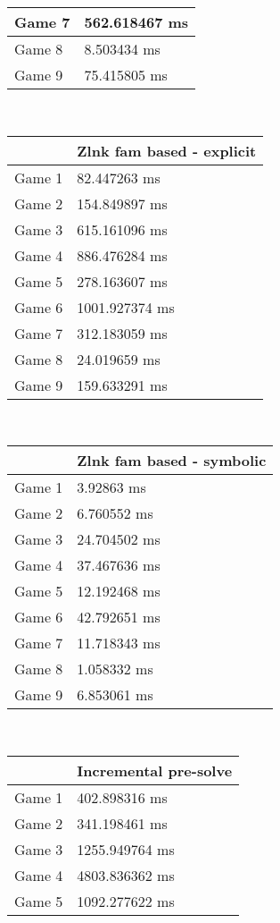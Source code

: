 \begin{multicols}{2}
\begin{tabular}{|l|l|}
	Game 7 & 562.618467 ms \\ \hline
	Game 8 & 8.503434 ms \\ \hline
	Game 9 & 75.415805 ms \\ \hline
\end{tabular}\\
\begin{tabular}{|l|l|}
	\hline
	& Zlnk fam based - explicit \\ \hline
	Game 1 & 82.447263 ms \\ \hline
	Game 2 & 154.849897 ms \\ \hline
	Game 3 & 615.161096 ms \\ \hline
	Game 4 & 886.476284 ms \\ \hline
	Game 5 & 278.163607 ms \\ \hline
	Game 6 & 1001.927374 ms \\ \hline
	Game 7 & 312.183059 ms \\ \hline
	Game 8 & 24.019659 ms \\ \hline
	Game 9 & 159.633291 ms \\ \hline
\end{tabular}\\
\begin{tabular}{|l|l|}
	\hline
	& Zlnk fam based - symbolic \\ \hline
	Game 1 & 3.92863 ms \\ \hline
	Game 2 & 6.760552 ms \\ \hline
	Game 3 & 24.704502 ms \\ \hline
	Game 4 & 37.467636 ms \\ \hline
	Game 5 & 12.192468 ms \\ \hline
	Game 6 & 42.792651 ms \\ \hline
	Game 7 & 11.718343 ms \\ \hline
	Game 8 & 1.058332 ms \\ \hline
	Game 9 & 6.853061 ms \\ \hline
\end{tabular}\\
\begin{tabular}{|l|l|}
	\hline
	& Incremental pre-solve \\ \hline
	Game 1 & 402.898316 ms \\ \hline
	Game 2 & 341.198461 ms \\ \hline
	Game 3 & 1255.949764 ms \\ \hline
	Game 4 & 4803.836362 ms \\ \hline
	Game 5 & 1092.277622 ms \\ \hline

\end{tabular}
\end{multicols}

